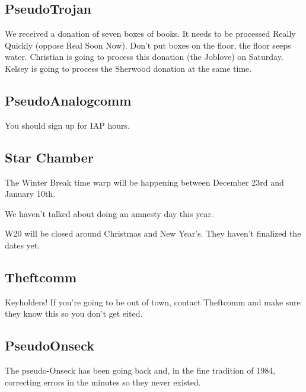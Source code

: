 \documentclass[10pt]{article}
\begin{document}
\subsection*{PseudoTrojan}
We received a donation of seven boxes of books. It needs to be processed Really Quickly (oppose Real Soon Now). Don't put boxes on the floor, the floor seeps water. Christian is going to process this donation (the Joblove) on Saturday. Kelsey is going to process the Sherwood donation at the same time.

\subsection*{PseudoAnalogcomm}
You should sign up for IAP hours.

\subsection*{Star Chamber}
The Winter Break time warp will be happening between December 23rd and January 10th.

We haven't talked about doing an amnesty day this year.

W20 will be closed around Christmas and New Year's. They haven't finalized the dates yet.

\subsection*{Theftcomm}
Keyholders! If you're going to be out of town, contact Theftcomm and make sure they know this so you don't get eited.

\subsection*{PseudoOnseck}
The pseudo-Onseck has been going back and, in the fine tradition of 1984, correcting errors in the minutes so they never existed.



\end{document}
